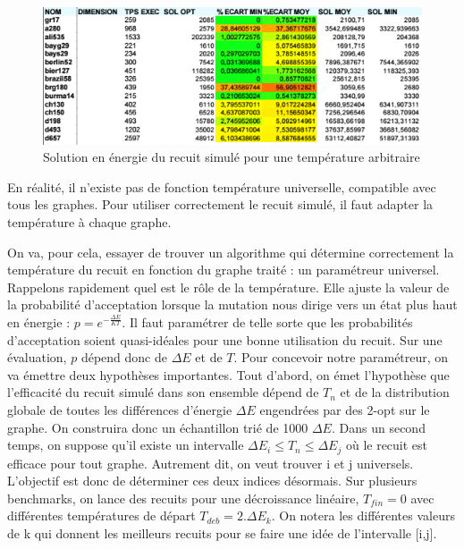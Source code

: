 \documentclass{article}%
\begin{document}
	\begin{figure}[!h]
	\begin{center}
	\includegraphics[scale=0.4]{perf_random_sa.png}
	\caption{Solution en énergie du recuit simulé pour une température arbitraire}
	\label{perf_random_sa}
	\end{center}
	\end{figure}
	
		En réalité, il n'existe pas de fonction température universelle, compatible avec tous les graphes. Pour utiliser correctement le recuit simulé, il faut adapter la température à chaque graphe.
		
		\vspace{1cm}
		
		On va, pour cela, essayer de trouver un algorithme qui détermine correctement la température du recuit en fonction du graphe traité : un paramétreur universel.
		Rappelons rapidement quel est le rôle de la température. Elle ajuste la valeur de la probabilité d'acceptation lorsque la mutation nous dirige vers un état plus haut en énergie : $ p = e^{-\frac{\Delta E}{KT}} $. Il faut paramétrer de telle sorte que les probabilités d'acceptation soient quasi-idéales pour une bonne utilisation du recuit. Sur une évaluation, $ p $  dépend donc de $ \Delta E $ et de $ T $. 
		Pour concevoir notre paramétreur, on va émettre deux hypothèses importantes. Tout d'abord, on émet l'hypothèse que l'efficacité du recuit simulé dans son ensemble dépend de $ T_{n} $ et de la distribution globale de toutes les différences d'énergie $ \Delta E $ engendrées par des 2-opt sur le graphe. On construira donc un échantillon trié de 1000 $ \Delta E $. Dans un second temps, on suppose qu'il existe un intervalle $ \Delta E_{i} \leq T_{n} \leq \Delta E_{j} $ où le recuit est efficace pour tout graphe. Autrement dit, on veut trouver i et j universels. 
		L'objectif est donc de déterminer ces deux indices désormais. Sur plusieurs benchmarks, on lance des recuits pour une décroissance linéaire, $ T_{fin} = 0 $ avec différentes températures de départ $ T_{deb} = 2.\Delta E_{k} $. On notera les différentes valeurs de k qui donnent les meilleurs recuits pour se faire une idée de l'intervalle [i,j].
		
\end{document}

